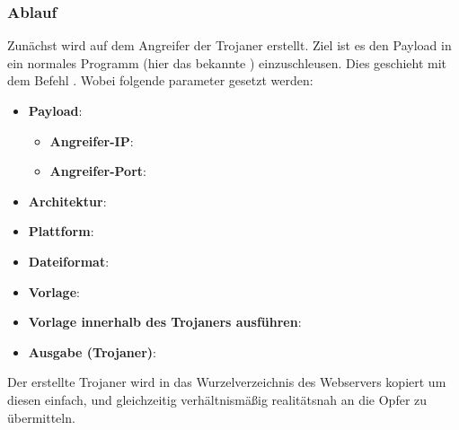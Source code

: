 \subsubsection{Ablauf}\label{sec:praktischeDurchfuehrung-ablauf}
Zunächst wird auf dem Angreifer der Trojaner erstellt.
Ziel ist es den Payload  in ein normales Programm (hier das bekannte ) einzuschleusen.
Dies geschieht mit dem Befehl . Wobei folgende parameter gesetzt werden:
\begin{itemize}
	\item \textbf{Payload}: 
	      \begin{itemize}
		      \item  \textbf{Angreifer-IP}: 
		      \item \textbf{Angreifer-Port}: 
		  \end{itemize}
	\item \textbf{Architektur}: 
	\item \textbf{Plattform}: 
	\item \textbf{Dateiformat}: 
	\item \textbf{Vorlage}: 
	\item \textbf{Vorlage innerhalb des Trojaners ausführen}: 
	\item \textbf{Ausgabe (Trojaner)}: 
\end{itemize}


Der erstellte Trojaner wird in das Wurzelverzeichnis des Webservers  kopiert um diesen einfach, und gleichzeitig verhältnismäßig realitätsnah an die Opfer zu übermitteln.

